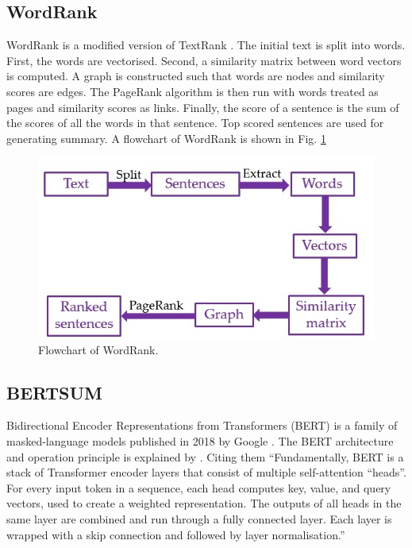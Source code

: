 \documentclass[11pt]{article}
\begin{document}
\subsection{WordRank}
\label{subsect:wordrank}

WordRank is a modified version of TextRank \citep{reza2020}. The initial text is split into words. First, the words are vectorised. Second, a similarity matrix between word vectors is computed. A graph is constructed such that words are nodes and similarity scores are edges. The PageRank algorithm is then run with words treated as pages and similarity scores as links. Finally, the score of a sentence is the sum of the scores of all the words in that sentence. Top scored sentences are used for generating summary. A flowchart of WordRank is shown in Fig. \ref{fig:wordrank}

\begin{figure}[!h]
\centering
\includegraphics[scale = 0.5]{../figures/wordrank.jpg}
\caption{Flowchart of WordRank.\label{fig:wordrank}}
\end{figure}

\subsection{BERTSUM}

Bidirectional Encoder Representations from Transformers (BERT) is a family of masked-language models published in 2018 by Google \citep{devlin2019google}. The BERT architecture and operation principle is explained by \citet{rogers2021primer}. Citing them ``Fundamentally, BERT is a stack of Transformer encoder layers that consist of multiple self-attention “heads”. For every input token in a sequence, each head computes key, value, and query vectors, used to create a weighted representation. The outputs of all heads in the same layer are combined and run through a fully connected layer. Each layer is wrapped with a skip connection and followed by layer normalisation.''
\end{document}
